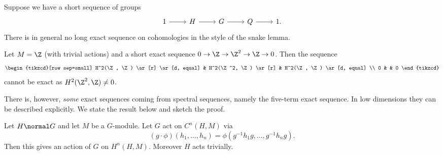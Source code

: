 \documentclass[a4paper]{article}
\begin{document}
Suppose we have a short sequence of groups
\[
  \begin{tikzcd}
    1 \ar[r] & H \ar[r] & G \ar[r] & Q \ar[r] & 1.
  \end{tikzcd}
\]
There is in general no long exact sequence on cohomologies in the style of the snake lemma.

\begin{eg}
  Let \(M = \Z\) (with trivial actions) and a short exact sequence \(0 \to \Z \to \Z^2 \to \Z \to 0\). Then the sequence
  \[
    \begin{tikzcd}[row sep=small]
      H^2(\Z, \Z) \ar[r] \ar[d, equal] & H^2(\Z^2, \Z) \ar[r] & H^2(\Z, \Z) \ar[d, equal] \\
      0 & & 0
    \end{tikzcd}
  \]
  cannot be exact as \(H^2(\Z^2, \Z) \ne 0\).
\end{eg}

There is, however, \emph{some} exact sequences coming from spectral sequences, namely the five-term exact sequence. In low dimensions they can be described explicitly. We state the result below and sketch the proof.

\begin{lemma}
  Let \(H \normal G\) and let \(M\) be a \(G\)-module. Let \(G\) act on \(C^n(H, M)\) via
  \[
    (g \cdot \phi)(h_1, \dots, h_n) = \phi(g^{-1} h_1g, \dots, g^{-1}h_n g).
  \]
  Then this gives an action of \(G\) on \(H^n(H, M)\). Moreover \(H\) acts trivially.
\end{lemma}
\end{document}
